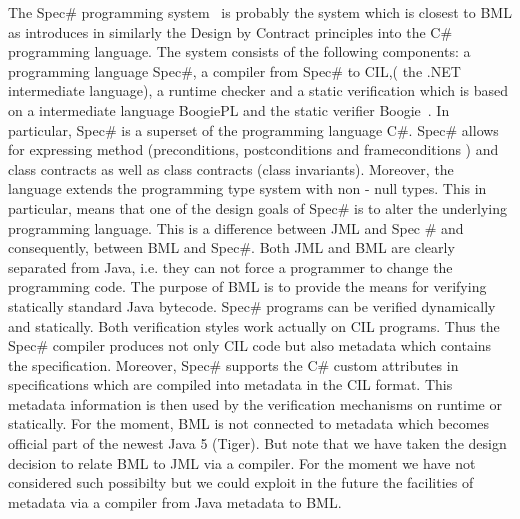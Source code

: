 The Spec\# programming system~\cite{BLS04sp} is probably the system which is closest to BML as  
introduces in similarly the Design by Contract principles into the C\#
programming language. %
The system consists of the following components:  a programming language Spec\#, a compiler from Spec\# to 
CIL,( the .NET intermediate language), a runtime checker and a static verification which is
 based on a intermediate language BoogiePL and the static verifier Boogie~\cite{BarnettCDJL05}.
 In particular, Spec\# is a superset of the programming language  C\#. Spec\# allows for expressing method (preconditions, postconditions and frameconditions )
 and class contracts as well as class contracts (class invariants). Moreover, the language extends the programming type system with non - null types.
 This in particular, means that one of the design goals of Spec\# is to alter the underlying programming language. This is a difference between JML and Spec \#
 and consequently, between BML and Spec\#. Both JML and BML are clearly separated from Java, i.e. they can not force a programmer 
 to change the programming code. The purpose of BML is to provide the means for verifying statically standard Java bytecode.
 Spec\# programs can be verified dynamically and statically. 
 Both verification styles work actually  on  CIL programs.
 Thus the Spec\# compiler produces not only CIL code but also metadata which contains 
 the specification. Moreover, Spec\# supports the C\# custom attributes in specifications which are compiled
 into metadata in the CIL format. This metadata  information is then used by the verification mechanisms on runtime
 or statically. For the moment,  BML is not connected to metadata which becomes official part of the newest
 Java 5 (Tiger). But note that  we have taken the design  decision to relate BML to JML via a compiler. For the moment we have not considered such possibilty 
 but we could exploit in the future the facilities of metadata via a compiler from Java metadata to BML. 
 



